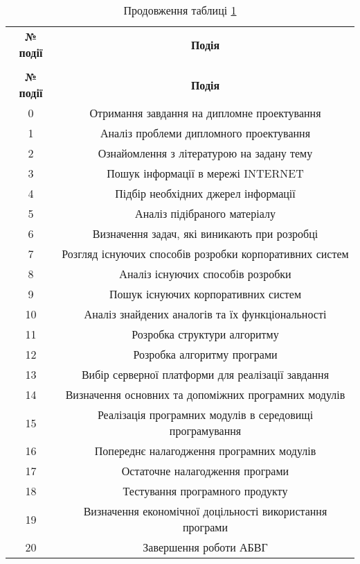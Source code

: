 \begin{center}\footnotesize
\begin{longtable}{|c|c|}

\captionsetup{justification=centering}
\caption{Події мережевого графа}\label{t:eco_1}\\
\hline
\multicolumn{1}{|c|}{\textbf{№ події}}&
\multicolumn{1}{c|}{\textbf{Подія}}\\\hline

\endfirsthead
\caption*{\hfill Продовження таблиці \ref{t:eco_1}}\\\hline

\multicolumn{1}{|c|}{\textbf{№ події}}&
\multicolumn{1}{c|}{\textbf{Подія}}\\\hline
\endhead

0 & Отримання завдання на дипломне проектування\\ \hline
1 & Аналіз проблеми дипломного проектування \\ \hline
2 & Ознайомлення з літературою на задану тему \\ \hline
3 & Пошук інформації в мережі INTERNET \\ \hline
4 & Підбір необхідних джерел інформації  \\ \hline
5 & Аналіз підібраного матеріалу  \\ \hline
6 & Визначення задач, які виникають при розробці  \\ \hline
7 & Розгляд існуючих способів розробки корпоративних систем \\ \hline
8 & Аналіз існуючих способів розробки  \\ \hline
9 & Пошук існуючих корпоративних систем \\ \hline
10 & Аналіз знайдених аналогів та їх функціональності \\ \hline
11 & Розробка структури алгоритму  \\ \hline
12 & Розробка алгоритму програми  \\ \hline
13 & Вибір серверної  платформи для реалізації завдання  \\ \hline
14 & Визначення основних та допоміжних програмних модулів  \\ \hline
15 & Реалізація програмних модулів в середовищі програмування  \\ \hline
16 & Попереднє налагодження програмних модулів \\ \hline
17 & Остаточне налагодження програми \\ \hline
18 & Тестування програмного продукту \\ \hline
19 & Визначення економічної доцільності використання програми \\ \hline
20 & Завершення роботи АБВГ\\ \hline

\end{longtable}
\end{center}



